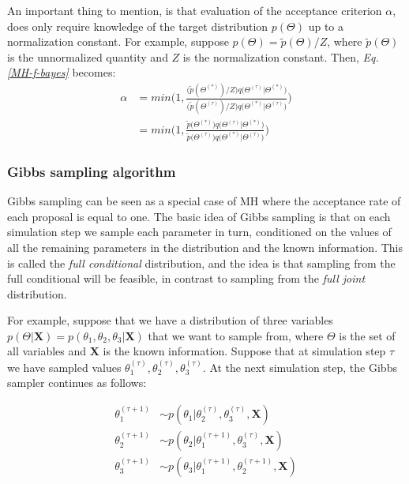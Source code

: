 An important thing to mention, is that evaluation of the acceptance criterion $\alpha$, does only require knowledge of the target distribution $p(\Theta)$ up to a normalization constant. For example, suppose $p(\Theta) = \widetilde{p}(\Theta)/Z$, where $\widetilde{p}(\Theta)$ is the unnormalized quantity and $Z$ is the normalization constant. Then, \emph{Eq. \ref{MH-f-bayes}} becomes:
\begin{equation} \label{MH-un-f-bayes}
  \begin{aligned}
	\alpha & = min\bigg(1, \frac{\big(\widetilde{p}(\Theta^{(*)})/Z\big)q\big(\Theta^{(\tau)} | \Theta^{(*)}\big)}{\big(\widetilde{p}(\Theta^{(\tau)})/Z\big) q\big(\Theta^{(*)}|\Theta^{(\tau)}\big)}\bigg) \\
		   & = min\bigg(1, \frac{\widetilde{p}\big(\Theta^{(*)}\big)q\big(\Theta^{(\tau)} | \Theta^{(*)}\big)}{\widetilde{p}\big(\Theta^{(\tau)}\big) q\big(\Theta^{(*)}|\Theta^{(\tau)}\big)}\bigg) 	
  \end{aligned}
\end{equation}

\subsubsection*{Gibbs sampling algorithm}
Gibbs sampling can be seen as a special case of MH where the acceptance rate of each proposal is equal to one. The basic idea of Gibbs sampling is that on each simulation step we sample each parameter in turn, conditioned on the values of all the remaining parameters in the distribution and the known information. This is called the \emph{full conditional} distribution, and the idea is that sampling from the full conditional will be feasible, in contrast to sampling from the \emph{full joint} distribution.

For example, suppose that we have a distribution of three variables $p(\Theta|\mathbf{X}) = p(\theta_{1}, \theta_{2}, \theta_{3}|\mathbf{X})$ that we want to sample from, where $\Theta$ is the set of all variables and $\mathbf{X}$ is the known information. Suppose that at simulation step $\tau$ we have sampled values $\theta_{1}^{(\tau)}, \theta_{2}^{(\tau)}, \theta_{3}^{(\tau)}$. At the next simulation step, the Gibbs sampler continues as follows:

\begin{equation} \label{gibbs-f-bayes}
  \begin{aligned}
	\theta_{1}^{(\tau+1)} & \sim p(\theta_{1} | \theta_{2}^{(\tau)}, \theta_{3}^{(\tau)}, \mathbf{X}) \\
	\theta_{2}^{(\tau+1)} & \sim p(\theta_{2} | \theta_{1}^{(\tau+1)}, \theta_{3}^{(\tau)}, \mathbf{X}) \\
	\theta_{3}^{(\tau+1)} & \sim p(\theta_{3} | \theta_{1}^{(\tau+1)}, \theta_{2}^{(\tau+1)}, \mathbf{X}) 
  \end{aligned}
\end{equation}
\vspace*{1mm}

